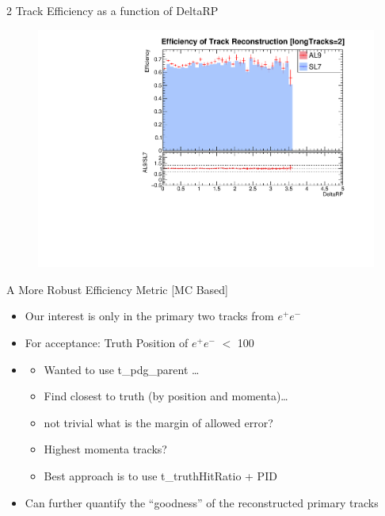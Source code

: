 \begin{frame}{2 Track Efficiency as a function of DeltaRP}
    \begin{figure}
        \includegraphics[width=\linewidth]{./output/Effi_eq2_DeltaRP.pdf}
    \end{figure}
\end{frame}

\begin{frame}{A More Robust Efficiency Metric [MC Based]}
    \begin{itemize}
        \item Our interest is only in the primary two tracks from $e^+e^-$
        \item For acceptance: Truth Position of $e^+e^-$ $<$ 100
        \item {}
        \begin{itemize}
            \item Wanted to use t\_pdg\_parent \ldots
            \item Find closest to truth (by position and momenta)\dots 
            \item not trivial what is the margin of allowed error?
            \item Highest momenta tracks?
            \item Best approach is to use t\_truthHitRatio + PID
        \end{itemize}
        \item Can further quantify the ``goodness'' of the reconstructed primary tracks
    \end{itemize}
\end{frame}

